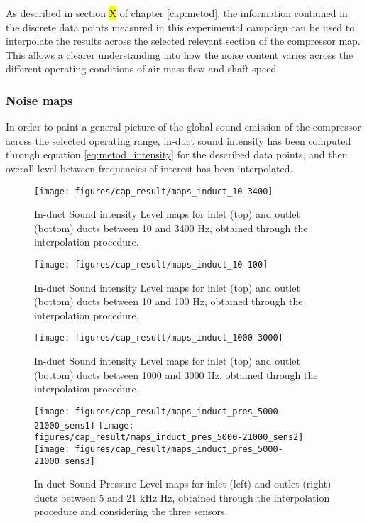 As described in section \hl{X} of chapter \ref{cap:metod}, the information contained in the discrete data points measured in this experimental campaign can be used to interpolate the results across the selected relevant section of the compressor map. This allows a clearer understanding into how the noise content varies across the different operating conditions of air mass flow and shaft speed.

\subsubsection{Noise maps}

In order to paint a general picture of the global sound emission of the compressor across the selected operating range, in-duct sound intensity has been computed through equation \ref{eq:metod_intensity} for the described data points, and then overall level between frequencies of interest has been interpolated. 

\begin{figure}[tbh!]
\centering
\texttt{[image: figures/cap\_result/maps\_induct\_10-3400]}
\vspace{-2.25cm}
\caption{In-duct Sound intensity Level maps for inlet (top) and outlet (bottom) ducts between 10 and 3400 Hz, obtained through the interpolation procedure.}
\label{fig:maps_induct_10-3400}
\end{figure}

\begin{figure}[tbh!]
\centering
\texttt{[image: figures/cap\_result/maps\_induct\_10-100]}
\vspace{-2.25cm}
\caption{In-duct Sound intensity Level maps for inlet (top) and outlet (bottom) ducts between 10 and 100 Hz, obtained through the interpolation procedure.}
\label{fig:maps_induct_10-100}
\end{figure}

\begin{figure}[tbh!]
\centering
\texttt{[image: figures/cap\_result/maps\_induct\_1000-3000]}
\vspace{-2.25cm}
\caption{In-duct Sound intensity Level maps for inlet (top) and outlet (bottom) ducts between 1000 and 3000 Hz, obtained through the interpolation procedure.}
\label{fig:maps_induct_1000-3000}
\end{figure}

\begin{figure}[tbh!]
\centering
\texttt{[image: figures/cap\_result/maps\_induct\_pres\_5000-21000\_sens1]}
\texttt{[image: figures/cap\_result/maps\_induct\_pres\_5000-21000\_sens2]}
\texttt{[image: figures/cap\_result/maps\_induct\_pres\_5000-21000\_sens3]}
\caption{In-duct Sound Pressure Level maps for inlet (left) and outlet (right) ducts between 5 and 21 kHz Hz, obtained through the interpolation procedure and considering the three sensors.}
\label{fig:maps_induct_SPL_3sens}
\end{figure}

